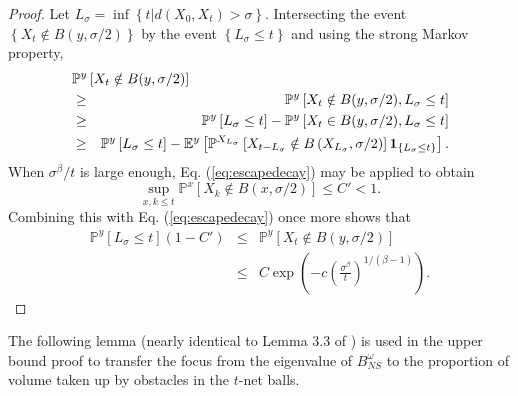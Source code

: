 \documentclass[letterpaper,oneside,english]{amsart}
\begin{document}
\begin{proof}
Let $L_{\sigma}=\inf\left\{ t\left|d\left(X_{0},X_{t}\right)>\sigma\right.\right\} .$
Intersecting the event $\left\{ X_{t}\notin B(y,\sigma/2)\right\} $
by the event $\left\{ L_{\sigma}\leq t\right\} $ and using the strong
Markov property, \begin{eqnarray*}
\lefteqn{\mathbb{P}^{y}\left[X_{t}\notin B(y,\sigma/2)\right]}\\
 & \geq & \mathbb{P}^{y}\left[X_{t}\notin B(y,\sigma/2),L_{\sigma}\leq t\right]\\
 & \geq & \mathbb{P}^{y}\left[L_{\sigma}\leq t\right]-\mathbb{P}^{y}\left[X_{t}\in B(y,\sigma/2),L_{\sigma}\leq t\right]\\
 & \geq & \mathbb{P}^{y}\left[L_{\sigma}\leq t\right]-\mathbb{E}^{y}\left[\mathbb{P}^{X_{L_{\sigma}}}\left[X_{t-L_{\sigma}}\notin B\left(X_{L_{\sigma}},\sigma/2\right)\right]\mathbf{1}_{\left\{ L_{\sigma}\leq t\right\} }\right].\end{eqnarray*}
 When $\sigma^{\beta}/t$ is large enough, Eq. (\ref{eq:escapedecay})
may be applied to obtain \[
\sup_{x,k\leq t}\mathbb{P}^{x}\left[X_{k}\notin B(x,\sigma/2)\right]\leq C'<1.\]
 Combining this with Eq. (\ref{eq:escapedecay}) once more shows that
\begin{eqnarray*}
\mathbb{P}^{y}\left[L_{\sigma}\leq t\right](1-C') & \leq & \mathbb{P}^{y}\left[X_{t}\notin B(y,\sigma/2)\right]\\
 & \leq & C\exp\left(-c\left(\frac{\sigma^{\beta}}{t}\right)^{1/(\beta-1)}\right).\end{eqnarray*}

 \end{proof}
  
 The following lemma (nearly identical to Lemma 3.3 of \cite{SznBolt})
is used in the upper bound proof to transfer the focus from the eigenvalue of $B_{NS}^{\omega}$ to the proportion of volume taken up by obstacles in the $t$-net balls.
\end{document}
